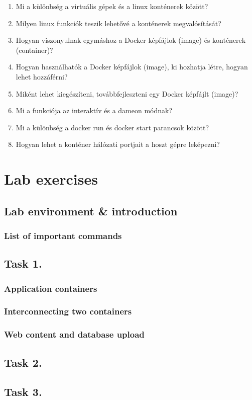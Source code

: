 \documentclass[a4paper]{article}
\begin{document}
\begin{enumerate}
    \item Mi a különbség a virtuális gépek és a linux konténerek között?
    \item Milyen linux funkciók teszik lehetővé a konténerek megvalósítását?
    \item Hogyan viszonyulnak egymáshoz a Docker képfájlok (image) és konténerek (container)?
    \item Hogyan használhatók a Docker képfájlok (image), ki hozhatja létre, hogyan lehet hozzáférni?
    \item Miként lehet kiegészíteni, továbbfejleszteni egy Docker képfájlt (image)?
    \item Mi a funkciója az interaktív és a dameon módnak?
    \item Mi a különbség a docker run és docker start parancsok között?
    \item Hogyan lehet a konténer hálózati portjait a hoszt gépre leképezni?
\end{enumerate}

\section{Lab exercises}

\subsection{Lab environment \& introduction}
\subsubsection{List of important commands}

\subsection{Task 1.}
\subsubsection{Application containers}
\subsubsection{Interconnecting two containers}
\subsubsection{Web content and database upload}
\subsection{Task 2.}
\subsection{Task 3.}
\end{document}
